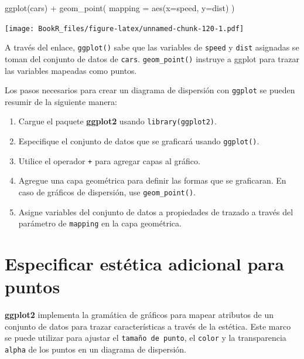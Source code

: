 \documentclass[
]{book}
\newenvironment{Shaded}{\begin{snugshade}}{\end{snugshade}}
\newcommand{\AttributeTok}[1]{\textcolor[rgb]{0.77,0.63,0.00}{#1}}
\newcommand{\FunctionTok}[1]{\textcolor[rgb]{0.00,0.00,0.00}{#1}}
\newcommand{\NormalTok}[1]{#1}
\newcommand{\SpecialCharTok}[1]{\textcolor[rgb]{0.00,0.00,0.00}{#1}}
\providecommand{\tightlist}{%
  \setlength{\itemsep}{0pt}\setlength{\parskip}{0pt}}
\begin{document}
\begin{Shaded}
\begin{Highlighting}[]
\FunctionTok{ggplot}\NormalTok{(cars) }\SpecialCharTok{+} 
  \FunctionTok{geom\_point}\NormalTok{(}
    \AttributeTok{mapping =} \FunctionTok{aes}\NormalTok{(}\AttributeTok{x=}\NormalTok{speed, }\AttributeTok{y=}\NormalTok{dist)}
\NormalTok{  )}
\end{Highlighting}
\end{Shaded}

\texttt{[image: BookR\_files/figure-latex/unnamed-chunk-120-1.pdf]}

A través del enlace, \texttt{ggplot()} sabe que las variables de \texttt{speed} y \texttt{dist} asignadas se toman del conjunto de datos de \texttt{cars}. \texttt{geom\_point()} instruye a ggplot para trazar las variables mapeadas como puntos.

Los pasos necesarios para crear un diagrama de dispersión con \texttt{ggplot} se pueden resumir de la siguiente manera:

\begin{enumerate}
\def\labelenumi{\arabic{enumi}.}
\tightlist
\item
  Cargue el paquete \textbf{ggplot2} usando \texttt{library(ggplot2)}.
\item
  Especifique el conjunto de datos que se graficará usando \texttt{ggplot()}.
\item
  Utilice el operador \texttt{+} para agregar capas al gráfico.
\item
  Agregue una capa geométrica para definir las formas que se graficaran. En caso de gráficos de dispersión, use \texttt{geom\_point()}.
\item
  Asigne variables del conjunto de datos a propiedades de trazado a través del parámetro de \texttt{mapping} en la capa geométrica.
\end{enumerate}

\hypertarget{especificar-estuxe9tica-adicional-para-puntos}{%
\section{Especificar estética adicional para puntos}\label{especificar-estuxe9tica-adicional-para-puntos}}

\textbf{ggplot2} implementa la gramática de gráficos para mapear atributos de un conjunto de datos para trazar características a través de la estética. Este marco se puede utilizar para ajustar el \texttt{tamaño\ de\ punto}, el \texttt{color} y la transparencia \texttt{alpha} de los puntos en un diagrama de dispersión.
\end{document}

